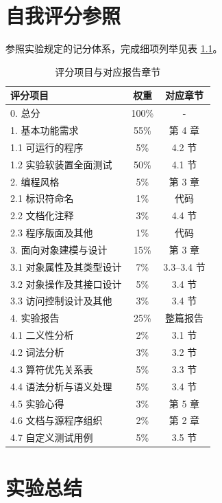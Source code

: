 \chapter{自我评分参照}
参照实验规定的记分体系，完成细项列举见表 \ref{tab:self-eval-map}。

\begin{table}[htbp]
    \centering
    \begin{tabular}{|p{5cm}|c|c|}
    \hline
    \textbf{评分项目} & \textbf{权重} & \textbf{对应章节} \\
    \hline
    0. 总分 & 100\% & - \\
    \hline
    1. 基本功能需求 & 55\% & 第 4 章 \\
    1.1 可运行的程序 & 5\% & 4.2 节 \\
    1.2 实验软装置全面测试 & 50\% & 4.1 节 \\
    \hline
    2. 编程风格 & 5\% & 第 3 章 \\
    2.1 标识符命名 & 1\% & 代码 \\
    2.2 文档化注释 & 3\% & 4.4 节 \\
    2.3 程序版面及其他 & 1\% & 代码 \\
    \hline
    3. 面向对象建模与设计 & 15\% & 第 3 章 \\
    3.1 对象属性及其类型设计 & 7\% & 3.3--3.4 节\\
    3.2 对象操作及其接口设计 & 5\% & 3.4 节\\
    3.3 访问控制设计及其他 & 3\% & 3.4 节\\
    \hline
    4. 实验报告 & 25\% & 整篇报告 \\
    4.1 二义性分析 & 2\% & 3.1 节 \\
    4.2 词法分析 & 3\% & 3.2 节 \\
    4.3 算符优先关系表 & 5\% & 3.3 节 \\
    4.4 语法分析与语义处理 & 5\% & 3.4 节 \\
    4.5 实验心得 & 3\% & 第 5 章 \\
    4.6 文档与源程序组织 & 2\% & 第 2 章 \\
    4.7 自定义测试用例 & 5\% & 3.5 节 \\
    \hline
    \end{tabular}
    \caption{评分项目与对应报告章节}
    \label{tab:self-eval-map}
\end{table}


\chapter{实验总结}

